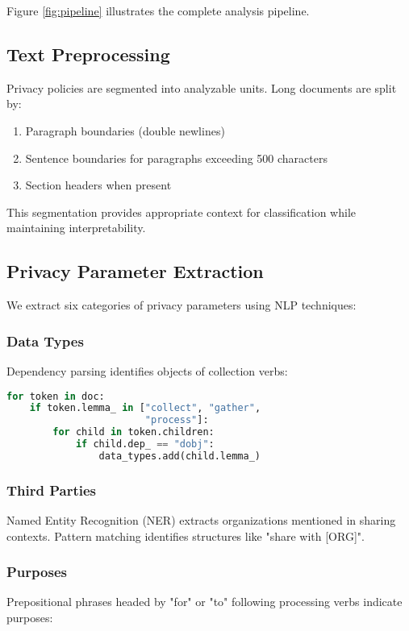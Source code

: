 \documentclass[conference]{IEEEtran}
\begin{document}
Figure \ref{fig:pipeline} illustrates the complete analysis pipeline.

\subsection{Text Preprocessing}

Privacy policies are segmented into analyzable units. Long documents are split by:

\begin{enumerate}
    \item Paragraph boundaries (double newlines)
    \item Sentence boundaries for paragraphs exceeding 500 characters
    \item Section headers when present
\end{enumerate}

This segmentation provides appropriate context for classification while maintaining interpretability.

\subsection{Privacy Parameter Extraction}

We extract six categories of privacy parameters using NLP techniques:

\subsubsection{Data Types}
Dependency parsing identifies objects of collection verbs:

\begin{lstlisting}[language=Python, basicstyle=\small\ttfamily]
for token in doc:
    if token.lemma_ in ["collect", "gather", 
                        "process"]:
        for child in token.children:
            if child.dep_ == "dobj":
                data_types.add(child.lemma_)
\end{lstlisting}

\subsubsection{Third Parties}
Named Entity Recognition (NER) extracts organizations mentioned in sharing contexts. Pattern matching identifies structures like "share with [ORG]".

\subsubsection{Purposes}
Prepositional phrases headed by "for" or "to" following processing verbs indicate purposes:
\end{document}
